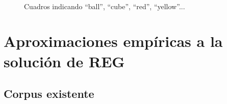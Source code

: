 \begin{figure}[ht]
\begin{center}
\\[0pt]
\caption{Cuadros indicando ``ball'', ``cube'', ``red'', ``yellow''...}
\label{fig-modelo17}
\end{center}
\end{figure}

\section{Aproximaciones emp\'iricas a la soluci\'on de REG}

\subsection{Corpus existente}

\label{sec:corpusTUNA}



